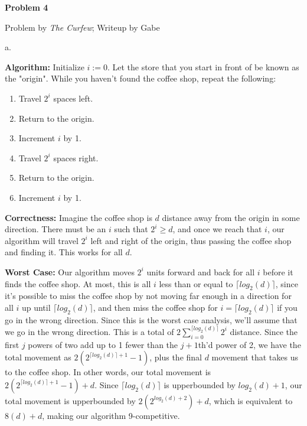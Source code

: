 \documentclass[12pt]{article}
\begin{document}
\begin{center}
\textbf{Problem 4}

Problem by \textit{The Curfew}; Writeup by Gabe
\end{center}

a.

\noindent \textbf{Algorithm:} Initialize $i := 0$. Let the store that you start in front of be known as the "origin". While you haven't found the coffee shop, repeat the following:

\begin{enumerate}

\item Travel $2^i$ spaces left.

\item Return to the origin.

\item Increment $i$ by 1.

\item Travel $2^i$ spaces right.

\item Return to the origin.

\item Increment $i$ by 1.

\end{enumerate}

\noindent \textbf{Correctness:} Imagine the coffee shop is $d$ distance away from the origin in some direction. There must be an $i$ such that $2^i \geq d$, and once we reach that $i$, our algorithm will travel $2^i$ left and right of the origin, thus passing the coffee shop and finding it. This works for all $d$.

\noindent \textbf{Worst Case:} Our algorithm moves $2^i$ units forward and back for all $i$ before it finds the coffee shop. At most, this is all $i$ less than or equal to $\lceil log_2(d) \rceil$, since it's possible to miss the coffee shop by not moving far enough in a direction for all $i$ up until $\lceil log_2(d) \rceil$, and then miss the coffee shop for $i = \lceil log_2(d) \rceil$ if you go in the wrong direction. Since this is the worst case analysis, we'll assume that we go in the wrong direction. This is a total of $2\sum_{i=0}^{\lceil log_2(d) \rceil} 2^i$ distance. Since the first $j$ powers of two add up to 1 fewer than the $j+1$th'd power of 2, we have the total movement as $2(2^{\lceil log_2(d) \rceil+1}-1)$, plus the final $d$ movement that takes us to the coffee shop. In other words, our total movement is $2(2^{\lceil log_2(d) \rceil+1}-1)+d$. Since $\lceil log_2(d) \rceil$ is upperbounded by $log_2(d)+1$, our total movement is upperbounded by $2(2^{log_2(d)+2})+d$, which is equivalent to $8(d)+d$, making our algorithm 9-competitive.
\end{document}
